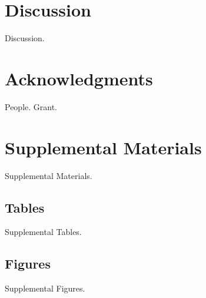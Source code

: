 \documentclass[12pt]{article}
\newcommand{\beginsupplement}{%
	\setcounter{table}{0}
	\renewcommand{\thetable}{S\arabic{table}}%
	\setcounter{figure}{0}
	\renewcommand{\thefigure}{S\arabic{figure}}%
}
\begin{document}


\section{Discussion}
\label{sec:disc}
Discussion.



\section*{Acknowledgments}
\label{sec:ack}
People. Grant.



\pagebreak
\printbibliography
\pagebreak


\section{Supplemental Materials}
\label{sec:supp-materials}
\beginsupplement
Supplemental Materials.



\subsection{Tables}
\label{ssec:supp-tables}
Supplemental Tables.


\subsection{Figures}
\label{ssec:supp-figures}
Supplemental Figures.
\end{document}

